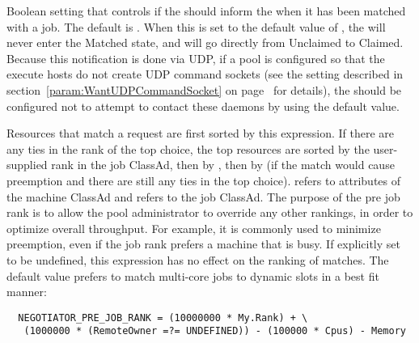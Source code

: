 \begin{description}
\label{param:NegotiatorInformStartd}
\item[\Macro{NEGOTIATOR\_INFORM\_STARTD}]
  Boolean setting that controls if the  should
  inform the  when it has been matched with a job.
  The default is .
  When this is set to the default value of , 
  the  will never
  enter the Matched state, and will go directly from Unclaimed to Claimed.
  Because this notification is done via UDP, if a pool is configured
  so that the execute hosts do not create UDP command sockets (see the
   setting described in
  section~\ref{param:WantUDPCommandSocket} on
  page~\pageref{param:WantUDPCommandSocket} for details), 
  the  should be configured not to attempt to contact
  these  daemons by using the default value.

\label{param:NegotiatorPreJobRank}
\item[\Macro{NEGOTIATOR\_PRE\_JOB\_RANK}]
  Resources that match a request
  are first sorted by this expression.  If there are any ties in the
  rank of the top choice, the top resources are sorted by the
  user-supplied rank in the job ClassAd, then by
  , then by
   (if the match would cause preemption and
  there are still any ties in the top choice).  \verb@MY@ refers to
  attributes of the machine ClassAd and \verb@TARGET@ refers to the
  job ClassAd.  The purpose of the pre job rank is to allow the pool
  administrator to override any other rankings, in order to optimize
  overall throughput.  For example, it is commonly used to minimize
  preemption, even if the job rank prefers a machine that is busy.
  If explicitly set to be undefined, 
  this expression has no effect on the ranking of matches.
  The default value prefers to match multi-core jobs to dynamic slots in
  a best fit manner:

\footnotesize
\begin{verbatim}
  NEGOTIATOR_PRE_JOB_RANK = (10000000 * My.Rank) + \
   (1000000 * (RemoteOwner =?= UNDEFINED)) - (100000 * Cpus) - Memory
\end{verbatim}
\normalsize


\end{description}
